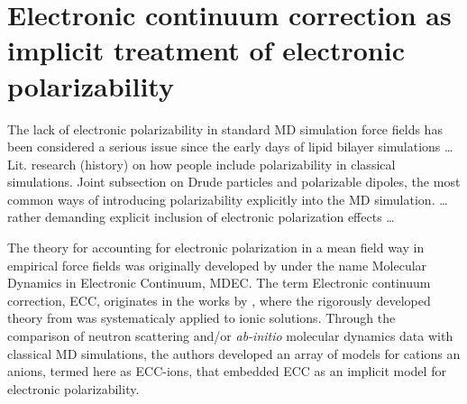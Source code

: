 \section{Electronic continuum correction as implicit treatment of electronic polarizability}
\label{section:ecc}

The lack of electronic polarizability in standard MD simulation
force fields has been considered a serious issue since the early days of
lipid bilayer simulations \dots
  Lit. research (history) on how people include polarizability in classical simulations. 
 Joint subsection on Drude particles and polarizable dipoles, the most common ways of introducing polarizability explicitly into the MD simulation. 
\ldots rather demanding explicit inclusion
of electronic polarization effects \cite{lucas12,chowdhary13} \dots

The theory for accounting for electronic polarization in a mean field way in empirical force fields
was originally developed by \citet{leontyev09} under the name Molecular Dynamics in Electronic Continuum, MDEC. 
The term Electronic continuum correction, ECC, originates in the works by \citet{Pluharova2014, kohagen14, kohagen16, martinek17},
where the rigorously developed theory from \citep{leontyev14} was systematicaly applied to ionic solutions.
Through the comparison of neutron scattering and/or \emph{ab-initio} molecular dynamics data with classical MD simulations, 
the authors developed an array of models for cations an anions, termed here as ECC-ions,
that embedded ECC as an implicit model for electronic polarizability. 



